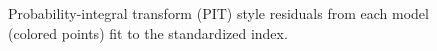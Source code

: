 \documentclass[
  11pt,
]{SCreport}
\begin{document}
\begin{figure}[H]


\caption{\label{fig-idx-residuals}Probability-integral transform (PIT)
style residuals from each model (colored points) fit to the standardized
index.}

\end{figure}%

\newpage
\end{document}
